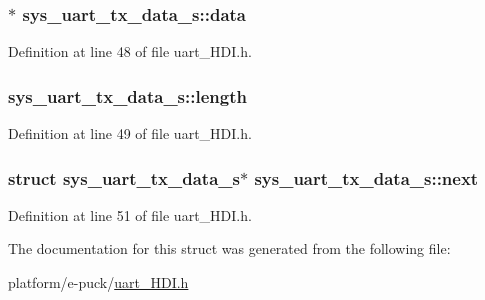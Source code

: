 \subsubsection[{data}]{$\ast$ sys\+\_\+uart\+\_\+tx\+\_\+data\+\_\+s\+::data}\label{structsys__uart__tx__data__s_a78c6d8a44625afa69057dbf3d2c7013b}


Definition at line 48 of file uart\+\_\+\+H\+D\+I.\+h.

\hypertarget{structsys__uart__tx__data__s_a8722c46cb1b932884a2105316b490328}{}
\subsubsection[{length}]{ sys\+\_\+uart\+\_\+tx\+\_\+data\+\_\+s\+::length}\label{structsys__uart__tx__data__s_a8722c46cb1b932884a2105316b490328}


Definition at line 49 of file uart\+\_\+\+H\+D\+I.\+h.

\hypertarget{structsys__uart__tx__data__s_ab931bb63187bc75b8b800a08d902b1ad}{}
\subsubsection[{next}]{\setlength{\rightskip}{0pt plus 5cm}struct {\bf sys\+\_\+uart\+\_\+tx\+\_\+data\+\_\+s}$\ast$ sys\+\_\+uart\+\_\+tx\+\_\+data\+\_\+s\+::next}\label{structsys__uart__tx__data__s_ab931bb63187bc75b8b800a08d902b1ad}


Definition at line 51 of file uart\+\_\+\+H\+D\+I.\+h.



The documentation for this struct was generated from the following file\+:\begin{DoxyCompactItemize}
\item 
platform/e-\/puck/\hyperlink{uart__HDI_8h}{uart\+\_\+\+H\+D\+I.\+h}\end{DoxyCompactItemize}
